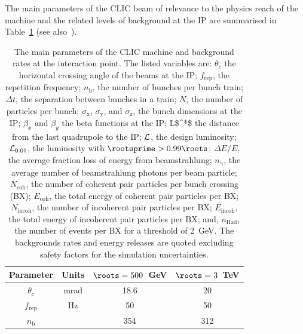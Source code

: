 The main parameters of the CLIC beam of relevance to the physics reach of the
machine and the related levels of background at the \acs{IP} are summarised in
Table~\ref{tab:chap3:clicBeam} (see also~\cite{CLICacceleratorCDR}).
\begin{table}[!hbt]
  \centering
  \begin{threeparttable}
  \captionsetup{width=\linewidth}
  \caption{The main parameters of the CLIC machine and background rates at the interaction point.
    The listed variables are:
    $\theta_c$ the horizontal crossing angle of the beams at the IP;
    $f_{\mathrm{rep}}$, the repetition frequency;
    $n_\mathrm{b}$, the number of bunches per bunch train;
    $\Delta t$, the separation between bunches in a train;
    $N$, the number of particles per bunch;
    $\sigma_\mathrm{x}$, $\sigma_\mathrm{y}$, and $\sigma_\mathrm{z}$, the bunch dimensions at the \acs{IP};
    $\beta_x$ and $\beta_y$ the beta functions at the IP;
    \acs{L$^*$} the distance from the last quadrupole to the IP;
    ${\cal{L}}$, the design luminosity;
    ${\cal{L}}_{0.01}$, the luminosity with $\rootsprime>0.99\roots$;
    $\Delta E/E$, the average fraction loss of energy from beamstrahlung;
    $n_\upgamma$, the average number of beamstrahlung photons per beam
    particle;
    $N_{\mathrm{coh}}$, the number of coherent pair particles per
    bunch crossing (BX);
    $E_{\mathrm{coh}}$, the total energy of coherent pair particles per BX;
    $N_{\mathrm{incoh}}$, the number of incoherent pair particles per BX;
    $E_{\mathrm{incoh}}$, the total energy of incoherent pair particles per BX;
    and,  $n_{\mathrm{Had}}$, the number of \gghadrons events per BX
    for a threshold of 2~GeV.  %
    The backgrounds rates and energy releases are quoted excluding
    safety factors for the simulation uncertainties.
    \label{tab:chap3:clicBeam}}
  \begin{tabular}{c c c c}
    \toprule
    Parameter              & Units               & $\roots=500$~GeV   & $\roots=3$~TeV     \\  \midrule
    $\theta_c$    &      mrad&       18.6   &        20          \\
    $f_{\mathrm{rep}}$     & Hz                  & 50                 & 50                 \\
    $n_{\mathrm{b}}$       &                     & 354                & 312                \\

\end{tabular}
\end{threeparttable}
\end{table}

